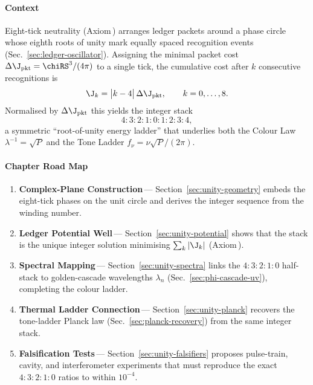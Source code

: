 \documentclass[11pt,oneside]{book}
\begin{document}
{\paragraph{Context}

Eight-tick neutrality (Axiom\,) arranges ledger packets around a
phase circle whose eighth roots of unity mark equally spaced
recognition events (Sec.~\ref{sec:ledger-oscillator}).  
Assigning the minimal packet cost
\(\Delta\J_{\text{pkt}}=\chiRS^{3}/(4\pi)\) to a single tick,
the cumulative cost after $k$ consecutive recognitions is
\[
   \J_{k}
   =
   \bigl|k-4\bigr|\,
   \Delta\J_{\text{pkt}},
   \qquad
   k=0,\dots,8.
\]
Normalised by \(\Delta\J_{\text{pkt}}\) this yields the integer stack
\[
   4{:}3{:}2{:}1{:}0{:}1{:}2{:}3{:}4,
\]
a symmetric “root-of-unity energy ladder” that underlies both the
Colour Law $\lambda^{-1}\!=\!\sqrt{P}$ and the Tone Ladder
$f_{\nu}=\nu\sqrt{P}/(2\pi)$.

\paragraph{Chapter Road Map}

\begin{enumerate}\setlength\itemsep{4pt}
\item \textbf{Complex-Plane Construction}\,—
      Section~\ref{sec:unity-geometry} embeds the eight-tick phases
      on the unit circle and derives the integer sequence from the
      winding number.
\item \textbf{Ledger Potential Well}\,—
      Section~\ref{sec:unity-potential} shows that the stack is the
      unique integer solution minimising
      \(\sum_{k}|\J_{k}|\) (Axiom\,).
\item \textbf{Spectral Mapping}\,—
      Section~\ref{sec:unity-spectra} links the
      \(4{:}3{:}2{:}1{:}0\) half-stack to golden-cascade wavelengths
      \(\lambda_{n}\) (Sec.~\ref{sec:phi-cascade-uv}),
      completing the colour ladder.
\item \textbf{Thermal Ladder Connection}\,—
      Section~\ref{sec:unity-planck} recovers the
      tone-ladder Planck law
      (Sec.~\ref{sec:planck-recovery}) from the same integer stack.
\item \textbf{Falsification Tests}\,—
      Section~\ref{sec:unity-falsifiers} proposes pulse-train,
      cavity, and interferometer experiments that must reproduce the
      exact $4{:}3{:}2{:}1{:}0$ ratios to within $10^{-4}$.
\end{enumerate}

}
\end{document}
